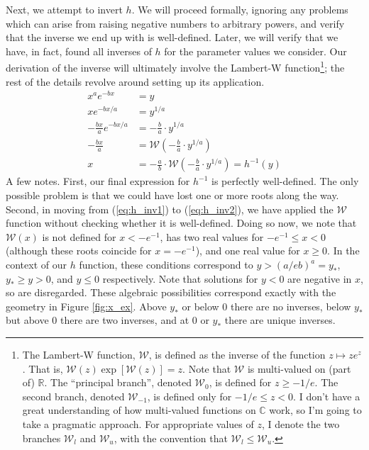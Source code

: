 \documentclass{article}
\newcommand{\bR}{\mathbb{R}}
\newcommand{\sW}{\mathscr{W}}
\begin{document}
Next, we attempt to invert $h$. We will proceed formally, ignoring any problems which can arise from raising negative numbers to arbitrary powers, and verify that the inverse we end up with is well-defined. Later, we will verify that we have, in fact, found all inverses of $h$ for the parameter values we consider. Our derivation of the inverse will ultimately involve the Lambert-W function\footnote{The Lambert-W function, $\sW$, is defined as the inverse of the function $z \mapsto ze^z$. That is, $\sW(z) \exp[\sW(z)] = z$. Note that $\sW$ is multi-valued on (part of) $\bR$. The ``principal branch'', denoted $\sW_0$, is defined for $z \geq -1/e$. The second branch, denoted $\sW_{-1}$, is defined only for $-1/e \leq z < 0$. I don't have a great understanding of how multi-valued functions on $\mathbb{C}$ work, so I'm going to take a pragmatic approach. For appropriate values of $z$, I denote the two branches $\sW_l$ and $\sW_u$, with the convention that $\sW_l \leq \sW_u$.}; the rest of the details revolve around setting up its application.
%
\begin{align}
    x^a e^{-bx} &= y\\
    x e^{-bx/a} &= y^{1/a}\\
    -\frac{bx}{a} e^{-bx/a} &= -\frac{b}{a} \cdot y^{1/a} \label{eq:h_inv1}\\
    -\frac{bx}{a} &= \sW\left( -\frac{b}{a} \cdot y^{1/a} \right) \label{eq:h_inv2}\\
    x &= -\frac{a}{b} \cdot \sW\left( -\frac{b}{a} \cdot y^{1/a} \right) = h^{-1}(y) \label{eq:h_inv_form}
\end{align}
%
A few notes. First, our final expression for $h^{-1}$ is perfectly well-defined. The only possible problem is that we could have lost one or more roots along the way. Second, in moving from (\ref{eq:h_inv1}) to (\ref{eq:h_inv2}), we have applied the $\sW$ function without checking whether it is well-defined. Doing so now, we note that $\sW(x)$ is not defined for $x < -e^{-1}$, has two real values for $-e^{-1} \leq x < 0$ (although these roots coincide for $x = -e^{-1}$), and one real value for $x \geq 0$. In the context of our $h$ function, these conditions correspond to $y > (a/eb)^a = y_*$, $y_* \geq y >0$, and $y \leq 0$ respectively. Note that solutions for $y < 0$ are negative in $x$, so are disregarded. These algebraic possibilities correspond exactly with the geometry in Figure \ref{fig:x_ex}. Above $y_*$ or below $0$ there are no inverses, below $y_*$ but above $0$ there are two inverses, and at $0$ or $y_*$ there are unique inverses. 
\end{document}
